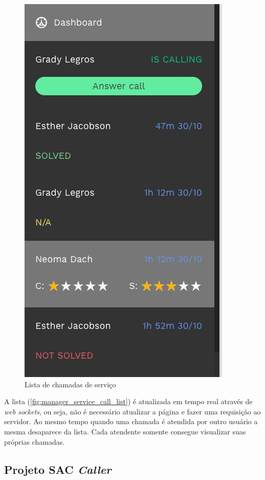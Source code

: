\begin{figure}[ht!]
	\centering
    \includegraphics[scale=0.4]{figures/screens/manager-service-call-list.jpg}
	\caption{Lista de chamadas de serviço}
	\label{fig:manager_service_call_list}
\end{figure}

A lista (\autoref{fig:manager_service_call_list}) é atualizada em tempo real através de \textit{web sockets}, ou seja, não é necessário atualizar a página e fazer uma requisição ao servidor. Ao mesmo tempo quando uma chamada é atendida por outro usuário a mesma desaparece da lista. Cada atendente somente consegue visualizar suas próprias chamadas.

\clearpage
\subsection{Projeto SAC \textit{Caller}}

